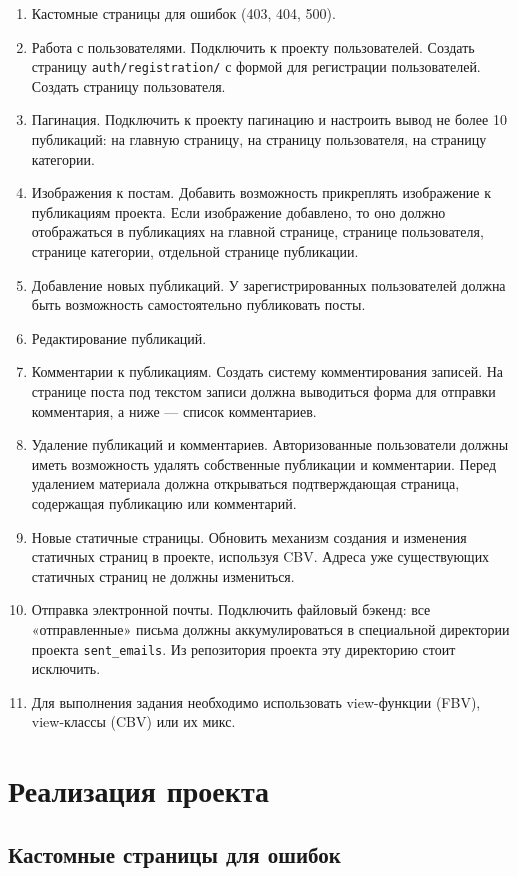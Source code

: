 \documentclass[15pt,a4paper]{extarticle}
\begin{document}
\begin{enumerate}
    \item Кастомные страницы для ошибок (403, 404, 500).
    \item Работа с пользователями. Подключить к проекту пользователей. Создать страницу \texttt{auth/registration/} с формой для регистрации пользователей. Создать страницу пользователя.
    \item Пагинация. Подключить к проекту пагинацию и настроить вывод не более 10 публикаций: на главную страницу, на страницу пользователя, на страницу категории.
    \item Изображения к постам. Добавить возможность прикреплять изображение к публикациям проекта. Если изображение добавлено, то оно должно отображаться в публикациях на главной странице, странице пользователя, странице категории, отдельной странице публикации.
    \item Добавление новых публикаций. У зарегистрированных пользователей должна быть возможность самостоятельно публиковать посты.
    \item Редактирование публикаций.
    \item Комментарии к публикациям. Создать систему комментирования записей. На странице поста под текстом записи должна выводиться форма для отправки комментария, а ниже — список комментариев.
    \item Удаление публикаций и комментариев. Авторизованные пользователи должны иметь возможность удалять собственные публикации и комментарии. Перед удалением материала должна открываться подтверждающая страница, содержащая публикацию или комментарий.
    \item Новые статичные страницы. Обновить механизм создания и изменения статичных страниц в проекте, используя CBV. Адреса уже существующих статичных страниц не должны измениться.
    \item Отправка электронной почты. Подключить файловый бэкенд: все «отправленные» письма должны аккумулироваться в специальной директории проекта \texttt{sent\_emails}. Из репозитория проекта эту директорию стоит исключить.
    \item Для выполнения задания необходимо использовать view-функции (FBV), view-классы (CBV) или их микс.
\end{enumerate}

\section{Реализация проекта}
\subsection{Кастомные страницы для ошибок}
\end{document}
